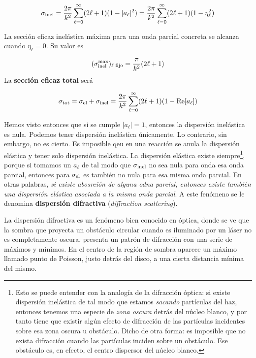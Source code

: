 \begin{mybox}
	\begin{equation}
		\sigma_{\text{inel}} = \frac{2\pi}{k^2} \sum_{\ell=0}^{\infty} (2\ell +1) (1 - |a_\ell|^2)
		= \frac{2\pi}{k^2} \sum_{\ell=0}^{\infty} (2\ell +1) (1 - \eta^2_\ell)
	\end{equation}
\end{mybox}

La sección eficaz inelástica máxima para una onda parcial concreta se alcanza cuando $\eta_\ell=0$. Su valor es

\begin{equation}
	(\sigma_{\text{inel}}^{\max})_{\ell \text{ fijo}} = \frac{\pi}{k^2} (2\ell +1)
\end{equation}
La \textbf{sección eficaz total} será
\begin{mybox}
	\begin{equation}
		\sigma_{\text{tot}} = \sigma_{\text{el}} + \sigma_{\text{inel}} = \frac{2\pi}{k^2} \sum_{\ell=0}^{\infty} (2\ell +1) (1 - \mathrm{Re} [a_\ell])
	\end{equation}
\end{mybox}
Hemos visto entonces que si se cumple $|a_\ell |=1$, entonces la dispersión inelástica es nula. Podemos tener dispersión inelástica únicamente. Lo contrario, sin embargo, no es cierto. Es imposible qeu en una reacción se anula la dispersión elástica y tener solo dispersión inelástica. La dispersión elástica existe siempre\footnote{Esto se puede entender con la analogía de la difracción óptica: si existe dispersión inelástica de tal modo que estamos \textit{sacando} partículas del haz, entonces tenemos una especie de \textit{zona oscura} detrás del núcleo blanco, y por tanto tiene que existir algún efecto de difracción de las partículas incidentes sobre esa zona oscura u obstáculo. Dicho de otra forma: es imposible que no exista difracción cuando las partículas inciden sobre un obstáculo. Ese obstáculo es, en efecto, el centro dispersor del núcleo blanco.}, porque si tomamos un $a_\ell$ de tal modo que $\sigma_{\text{\text{inel}}}$ no sea nula para onda esa onda parcial, entonces para $\sigma_{\text{el}}$ es también no nula para esa misma onda parcial. En otras palabras, \textit{si existe abosrción de alguna odna parcial, entonces existe también una dispersión elástica asociada a la misma onda parcial}. A este fenómeno se le denomina \textbf{dispersión difractiva} (\textit{diffraction scattering}). 

La dispersión difractiva es un fenómeno bien conocido en óptica, donde se ve que la sombra que proyecta un obstáculo circular cuando es iluminado por un láser no es completamente oscura, presenta un patrón de difracción con una serie de máximos y mínimos. En el centro de la región de sombra aparece un máximo llamado punto de Poisson, justo detrás del disco, a una cierta distancia mínima del mismo.

